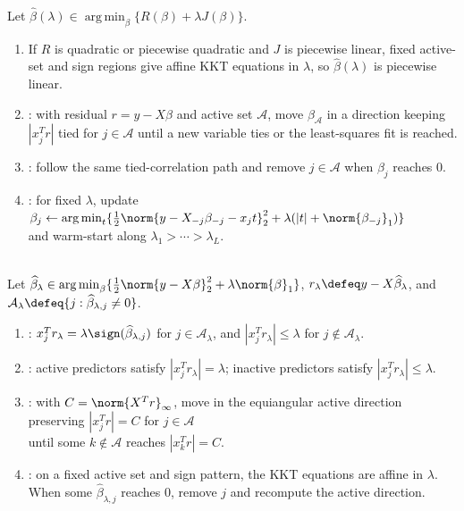 \begin{method} \label{meth:sl-piecewise-linear-paths} \\
Let $\widehat{\beta}(\lambda)\in\operatorname*{arg\,min}_{\beta}\{R(\beta)+\lambda J(\beta)\}$.
\begin{enumerate}[label=(\roman*)]
\setlength{\itemsep}{0pt}
\item If $R$ is quadratic or piecewise quadratic and $J$ is piecewise linear, fixed active-set and sign regions give affine KKT equations in $\lambda$, so $\widehat{\beta}(\lambda)$ is piecewise linear.
\item {}: with residual $r=y-X\beta$ and active set $\mathcal{A}$, move $\beta_{\mathcal{A}}$ in a direction keeping $|x_j^Tr|$ tied for $j\in\mathcal{A}$ until a new variable ties or the least-squares fit is reached.
\item {}: follow the same tied-correlation path and remove $j\in\mathcal{A}$ when $\beta_j$ reaches $0$.
\item {}: for fixed $\lambda$, update $\beta_j\gets\operatorname*{arg\,min}_{t}\{\frac12\norm{y-X_{-j}\beta_{-j}-x_jt}_2^2+\lambda(|t|+\norm{\beta_{-j}}_1)\}$\\
and warm-start along $\lambda_1>\cdots>\lambda_L$.
\end{enumerate}
\end{method}

\begin{method} \label{meth:sl-lar-lasso-modification} \\
Let $\widehat{\beta}_\lambda\in\operatorname*{arg\,min}_{\beta}\{\frac12\norm{y-X\beta}_2^2+\lambda\norm{\beta}_1\}$, $r_\lambda\defeq y-X\widehat{\beta}_\lambda$, and $\mathcal{A}_\lambda\defeq\{j:\widehat{\beta}_{\lambda,j}\neq0\}$.
\begin{enumerate}[label=(\roman*)]
\setlength{\itemsep}{0pt}
\item {}: $x_j^Tr_\lambda=\lambda\sign(\widehat{\beta}_{\lambda,j})$ for $j\in\mathcal{A}_\lambda$, and $|x_j^Tr_\lambda|\leq\lambda$ for $j\notin\mathcal{A}_\lambda$.
\item {}: active predictors satisfy $|x_j^Tr_\lambda|=\lambda$; inactive predictors satisfy $|x_j^Tr_\lambda|\leq\lambda$.
\item {}: with $C=\norm{X^Tr}_\infty$, move in the equiangular active direction preserving $|x_j^Tr|=C$ for $j\in\mathcal{A}$\\
until some $k\notin\mathcal{A}$ reaches $|x_k^Tr|=C$.
\item {}: on a fixed active set and sign pattern, the KKT equations are affine in $\lambda$.\\
When some $\widehat{\beta}_{\lambda,j}$ reaches $0$, remove $j$ and recompute the active direction.
\end{enumerate}
\end{method}

